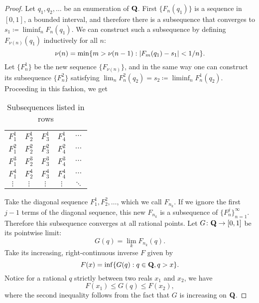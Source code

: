 \begin{proof}
    Let $q_1,q_2,\dotsc$ be an enumeration of $\mathbf{Q}$. First $\{F_n(q_1)\}$ is a sequence in $[0,1]$, a bounded interval, and therefore there is a subsequence that converges to $s_1 \coloneqq \liminf_n F_n(q_1)$. We can construct such a subsequence by defining $F_{\nu(n)}(q_1)$ inductively for all $n$: \[
        \nu(n) = \min\{m > \nu(n-1): \lvert F_m(q_1) - s_1 \rvert < 1/ n\}.
    \] Let $\{F^1_n\}$ be the new sequence $\{F_{\nu(n)}\}$, and in the same way one can construct its subsequence $\{F^2_n\}$ satisfying $\lim_n F^2_n(q_2) = s_2 \coloneqq \liminf_n F_n^1(q_2)$. Proceeding in this fashion, we get 
    \begin{table}[ht]
    \renewcommand{\arraystretch}{1.2}
        \centering
        \caption*{Subsequences listed in rows}
        \begin{tabular}{ccccc}
            $F_1^1$ & $F_2^1$ & $F_3^1$ & $F_4^1$ & $\cdots$ \\
            $F_1^2$ & $F_2^2$ & $F_3^2$ & $F_4^2$ & $\cdots$ \\
            $F_1^3$ & $F_2^3$ & $F_3^3$ & $F_4^3$ & $\cdots$ \\
            $F_1^4$ & $F_2^4$ & $F_3^4$ & $F_4^4$ & $\cdots$ \\
            $\vdots$ & $\vdots$ & $\vdots$ & $\vdots$ & $\ddots$
        \end{tabular}
        \renewcommand{\arraystretch}{1}
    \end{table}
    
    Take the diagonal sequence $F_1^1, F_2^2,\dotsc$, which we call $F_{n_k}$. If we ignore the first $j-1$ terms of the diagonal sequence, this new $F_{n_k}$ is a subsequence of $\{F_n^j\}_{n=1}^\infty$. Therefore this subsequence converges at all rational points. Let $G\colon \mathbf{Q} \to [0,1]$ be its pointwise limit: \[
        G(q) = \lim_k F_{n_k}(q).
    \] Take its increasing, right-continuous inverse $F$ given by \[
        F(x) = \inf\{G(q): q\in \mathbf{Q}, q > x\}.
    \]
    Notice for a rational $q$ strictly between two reals $x_1$ and $x_2$, we have \begin{equation}
        F(x_1) \leq G(q) \leq F(x_2), \label{eq:right-cont-inv-ineq}
    \end{equation}
    where the second inequality follows from the fact that $G$ is increasing on $\mathbf{Q}$.


\end{proof}
